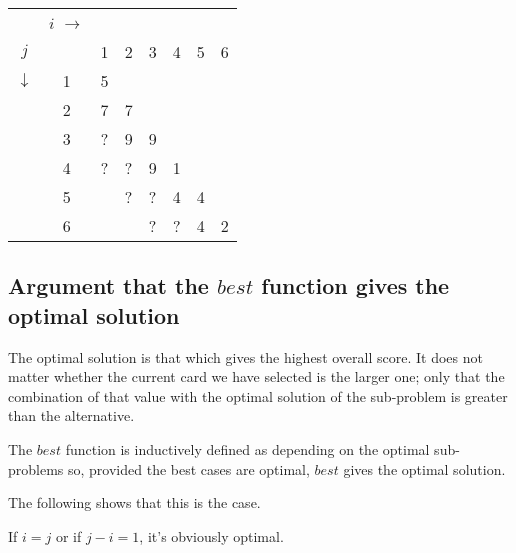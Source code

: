 \documentclass[11pt]{article}
\begin{document}
	\begin{tabular}[c]{cc|cccccc}
		& $i$ $\rightarrow$\\

		$j$          &   & 1 & 2 & 3 & 4 & 5 & 6 \\
		             \cline{2-8}
					 $\downarrow$ & 1 & 5 & \cellcolor{black!10} & \cellcolor{black!10} & \cellcolor{black!10} & \cellcolor{black!10} & \cellcolor{black!10} \\
		             & 2 & 7 & 7 & \cellcolor{black!10} & \cellcolor{black!10} & \cellcolor{black!10} & \cellcolor{black!10} \\
		             & 3 & ? & 9 & 9 & \cellcolor{black!10} & \cellcolor{black!10} & \cellcolor{black!10} \\
		             & 4 & ? & ? & 9 & 1 & \cellcolor{black!10} & \cellcolor{black!10} \\
					 & 5 & \color{myred}{\textbf{?}} & ? & ? & 4 & 4 & \cellcolor{black!10} \\
					 & 6 & \color{myred}{\textbf{?}} & \color{myred}{\textbf{?}} & ? & ? & 4 & 2
		
	\end{tabular}
	\hspace{2cm}
	\begin{minipage}{5cm}
	\end{minipage}



\subsection{Argument that the $best$ function gives the optimal solution}

The optimal solution is that which gives the highest overall score. It does not matter whether the current card we have selected
is the larger one; only that the combination of that value with the optimal solution of the sub-problem is greater than the
alternative.

The $best$ function is inductively defined as depending on the optimal sub-problems so, provided the best cases are optimal,
$best$ gives the optimal solution.

The following shows that this is the case.

If $i = j$ or if $j-i = 1$, it's obviously optimal.
\end{document}

